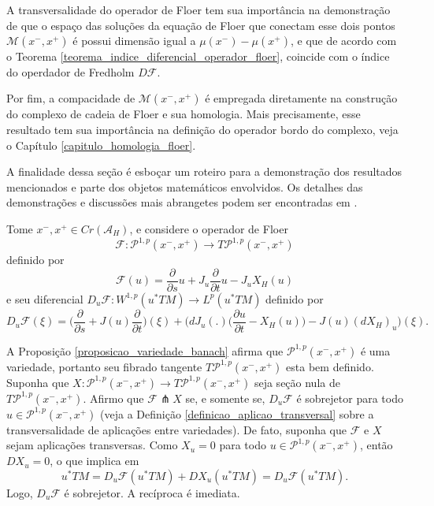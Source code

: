 \documentclass[12pt]{book}
\newcommand{\bigparenteses}[1]{\Big( #1 \Big) }
\newcommand{\caminhosexponenciaisconectantes}[2]{\mathcal{P}^{1,p}(#1, #2)}
\newcommand{\caminhosexponenciaisconectantespadrao}{\caminhosexponenciaisconectantes{x^{-}}{x^{+}}}
\newcommand{\diferencialfloer}{D\operadorFloer}
\newcommand{\diferencialfloerponto}[1]{D_{#1}\operadorFloer}
\newcommand{\derivadaparcial}[2]{\frac{\partial #1}{\partial #2}}
\newcommand{\diferencialhamiltoniano}[1]{(dX_{H})_{#1}}
\newcommand{\energiafinitaM}{\mathcal{M}}
\newcommand{\energiafinitaMconectante}{\energiafinitaM(x^{-}, x^{+})}
\newcommand{\espacoLp}[1]{L^{p}(#1)}
\newcommand{\espacosobolev}[1]{W^{1,p}(#1)}
\newcommand{\funcionalH}{\mathcal{A}_{H}}
\newcommand{\operadorFloer}{\mathcal{F}}
\newcommand{\operadorFloerDefinicao}[1]{\derivadaparcial{}{s}#1 + J_{#1}\derivadaparcial{}{t}#1 - J_{#1}X_{H}(#1)}
\newcommand{\operadorFloerParametro}[1]{\mathcal{F}(#1)}
\newcommand{\pontoscriticos}[1]{\textit{Cr}(#1)}
\newcommand{\pullbackfibradotangente}[2]{#1^{*}T#2}
\newcommand{\pullbackfibradotangenteM}[1]{\pullbackfibradotangente{#1}{M}}
\begin{document}
	A transversalidade do operador de Floer tem sua importância na demonstração de que o espaço das soluções da equação de Floer que conectam esse dois pontos $\energiafinitaMconectante$ é possui dimensão igual a $\mu(x^{-})-\mu(x^{+})$, e que de acordo com o Teorema \ref{teorema_indice_diferencial_operador_floer},  coincide com o índice do operdador de Fredholm $\diferencialfloer$.
	
	Por fim, a compacidade de $\energiafinitaMconectante$ é empregada diretamente na construção do complexo de cadeia de Floer e sua homologia. Mais precisamente, esse resultado tem sua importância na definição do operador bordo do complexo, veja o Capítulo \ref{capitulo_homologia_floer}.
	
	A finalidade dessa seção é esboçar um roteiro para a demonstração dos resultados mencionados e parte dos objetos matemáticos envolvidos. Os detalhes das demonstrações e discussões mais abrangetes podem ser encontradas em \cite{audi_floer_homology}.
	
	Tome $x^{-},x^{+}\in \pontoscriticos{\funcionalH}$, e considere o operador de Floer 
	$$
	\operadorFloer: \caminhosexponenciaisconectantespadrao \to T\caminhosexponenciaisconectantespadrao
	$$  
	definido por
	$$
	\operadorFloerParametro{u} =\operadorFloerDefinicao{u}
	$$
	e seu diferencial $\diferencialfloerponto{u}: \espacosobolev{\pullbackfibradotangenteM{u}} \to \espacoLp{\pullbackfibradotangenteM{u}}$ definido por
	$$
	\diferencialfloerponto{u}(\xi)= \Big( \derivadaparcial{}{s} + J(u)\derivadaparcial {}{t}\Big)(\xi)+ \Big(dJ_{u}(.)\bigparenteses{\derivadaparcial{u}{t} - X_{H}(u)} - J(u) \diferencialhamiltoniano{u}\Big)(\xi).
	$$
	
	A Proposição \ref{proposicao_variedade_banach} afirma que $\caminhosexponenciaisconectantespadrao$ é uma variedade, portanto seu fibrado tangente $T\caminhosexponenciaisconectantespadrao$ esta bem definido. Suponha que $X:\caminhosexponenciaisconectantespadrao \to T\caminhosexponenciaisconectantespadrao$ seja seção nula de $T\caminhosexponenciaisconectantespadrao$. Afirmo que $\operadorFloer \pitchfork X$ se, e somente se, $\diferencialfloerponto{u}$ é sobrejetor para todo $u\in \caminhosexponenciaisconectantespadrao$ (veja a Definição \ref{definicao_aplicao_transversal} sobre a transversalidade de aplicações entre variedades). De fato, suponha que $\operadorFloer$ e $X$ sejam aplicações transversas. Como $X_{u} = 0$ para todo $u \in \caminhosexponenciaisconectantespadrao$, então $DX_{u} = 0$, o que implica em
	$$
	\pullbackfibradotangenteM{u}=\diferencialfloerponto{u}(\pullbackfibradotangenteM{u})+DX_{u}(\pullbackfibradotangenteM{u}) = \diferencialfloerponto{u}(\pullbackfibradotangenteM{u}).$$ 
	Logo, $\diferencialfloerponto{u}$ é sobrejetor. A recíproca é imediata.
	
\end{document}

